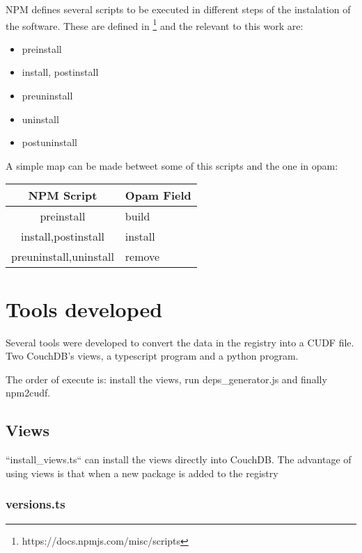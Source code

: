\documentclass[letterpaper,12pt]{report}
\begin{document}
NPM defines several scripts to be executed in different steps of the instalation
of the software. These are defined in
\footnote{https://docs.npmjs.com/misc/scripts} and the relevant to this work
are:

\begin{itemize}
    \item preinstall
    \item install, postinstall
    \item preuninstall
    \item uninstall
    \item postuninstall
\end{itemize}

A simple map can be made betweet some of this scripts and the one in opam:


\begin{tabularx}{\textwidth}{|c|X|}
        \hline
        NPM Script              & Opam Field    \\ \hline \hline
        preinstall              & build         \\ \hline
        install,postinstall     & install       \\ \hline
        preuninstall,uninstall  & remove        \\ \hline
        \hline
\end{tabularx}



\section{Tools developed}

Several tools were developed to convert the data in the registry into a CUDF
file. Two CouchDB's views, a typescript program and a python program.

The order of execute is: install the views, run deps\_generator.js and finally
npm2cudf.

\subsection{Views}

``install\_views.ts`` can install the views directly into CouchDB. The advantage
of using views is that when a new package is added to the registry 

\subsubsection{versions.ts}
\end{document}
